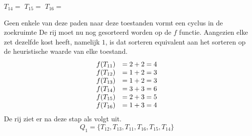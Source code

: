 \documentclass[alternative-exam.tex]{subfiles}
\begin{document}
\begin{center}
$T_{14} = $
$T_{15} = $
$T_{16} = $
\end{center}
Geen enkele van deze paden naar deze toestanden vormt een cyclus in de zoekruimte De rij moet nu nog gesorteerd worden op de $f$ functie. Aangezien elke zet dezelfde kost heeft, namelijk $1$, is dat sorteren equivalent aan het sorteren op de heuristische waarde van elke toestand.
\[
\begin{array}{c c}
f(T_{11}) &= 2 + 2 = 4\\
f(T_{12}) &= 1 + 2 = 3\\
f(T_{13}) &= 1 + 2 = 3\\
f(T_{14}) &= 3 + 3 = 6\\
f(T_{15}) &= 2 + 3 = 5\\
f(T_{16}) &= 1 + 3 = 4\\
\end{array}
\]
De rij ziet er na deze stap als volgt uit.
\[
Q_1 = \{T_{12}, T_{13}, T_{11}, T_{16}, T_{15}, T_{14}\}
\]
\end{document}

